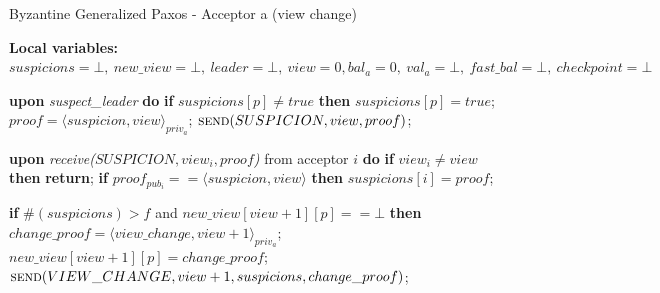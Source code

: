 \begin{algorithm} 
	\caption{Byzantine Generalized Paxos - Acceptor a (view change)}
	\label{BFT-Proc}
	\textbf{Local variables:} $suspicions = \bot,\ new\_view = \bot,\ leader = \bot,\ view = 0, bal_a = 0,\ val_a = \bot,\ fast\_bal = \bot,\ checkpoint=\bot$
	\begin{algorithmic}[1]		
		\State \textbf{upon} \textit{suspect\_leader} \textbf{do} 
		\State\hspace{\algorithmicindent} \textbf{if} $suspicions[p] \neq true$ \textbf{then}
		\State\hspace{\algorithmicindent}\hspace{\algorithmicindent} $suspicions[p] = true$;
		\State\hspace{\algorithmicindent}\hspace{\algorithmicindent} $proof = \langle suspicion, view \rangle_{priv_a}$;
		\State \hspace{\algorithmicindent}\hspace{\algorithmicindent} $\Call{send}{SUSPICION, view,proof}$;	
		\State
		
		\State \textbf{upon} \textit{receive($SUSPICION, view_i, proof$)} from acceptor $i$ \textbf{do} 
		\State\hspace{\algorithmicindent} \textbf{if} $view_i \neq view$ \textbf{then}
		\State\hspace{\algorithmicindent}\hspace{\algorithmicindent} \textbf{return};
		\State\hspace{\algorithmicindent} \textbf{if} $proof_{pub_i} == \langle suspicion, view \rangle$ \textbf{then}
		\State\hspace{\algorithmicindent}\hspace{\algorithmicindent} $suspicions[i] = proof$;
		
		\State\hspace{\algorithmicindent} \textbf{if} $\#(suspicions) > f$ and $new\_view[view+1][p] == \bot$ \textbf{then}
		\State\hspace{\algorithmicindent}\hspace{\algorithmicindent} $change\_proof = \langle view\_change, view +1 \rangle_{priv_a}$;
		\State\hspace{\algorithmicindent}\hspace{\algorithmicindent} $new\_view[view+1][p] = change\_proof$;
		\State\hspace{\algorithmicindent}\hspace{\algorithmicindent} $\Call{send}{VIEW\_CHANGE, view+1, suspicions, change\_proof}$;
		\State
		

\end{algorithmic}
\end{algorithm}
